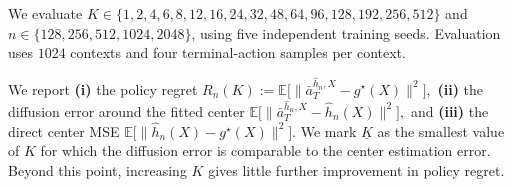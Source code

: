 \documentclass{article}
\newcommand{\1}{\mathbbm{1}}
\numberwithin{equation}{section}
\begin{document}
We evaluate $K\in
\{1,2,4,6,8,12,16,24,32,48,64,96,128,192,256,512\}$ and
\(n\in\{128,256,512,1024,2048\}\), using five independent training
seeds. Evaluation uses \(1024\) contexts and four terminal-action samples
per context.

We report {\bf (i)} the policy regret $R_n(K)
:=
\mathbb E\big[
\big\|
\bar a_T^{\widehat h_n,X}-g^\star(X)
\big\|^2
\big],$
{\bf (ii)} the diffusion error around the fitted center $\mathbb E\!\big[
\big\|
\bar a_T^{\widehat h_n,X}-\widehat h_n(X)
\big\|^2
\big],$
and {\bf (iii)} the direct center MSE $\mathbb E\!\big[
\big\|
\widehat h_n(X)-g^\star(X)
\big\|^2
\big]$. We mark \(\underline K\) as the smallest value of \(K\) for which the
diffusion error is comparable to the center estimation error. Beyond this
point, increasing \(K\) gives little further improvement in policy regret.
\end{document}
